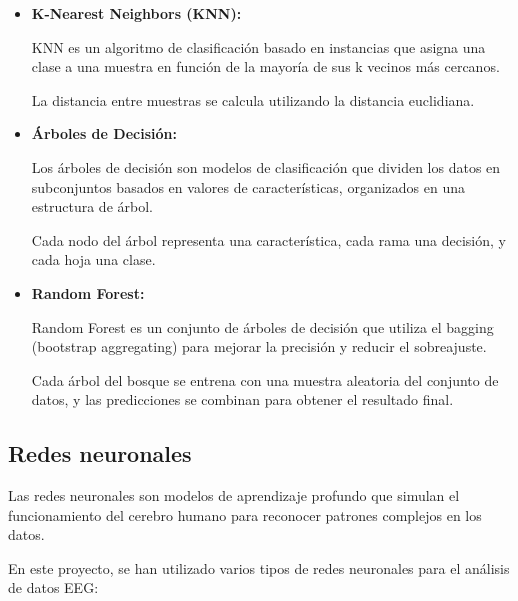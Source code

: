 \begin{itemize}
\begin{itemize}
	\item
	\textbf{K-Nearest Neighbors (KNN):}
	
	KNN es un algoritmo de clasificación basado en instancias que asigna una clase a una muestra en función de la mayoría de sus k vecinos más cercanos.
	
	La distancia entre muestras se calcula utilizando la distancia euclidiana.

	\item
	\textbf{Árboles de Decisión:}	
	
	Los árboles de decisión son modelos de clasificación que dividen los datos en subconjuntos basados en valores de características, organizados en una estructura de árbol.
	
	Cada nodo del árbol representa una característica, cada rama una decisión, y cada hoja una clase.
	

	\item
	\textbf{Random Forest:}	
	
	Random Forest es un conjunto de árboles de decisión que utiliza el bagging (bootstrap aggregating) para mejorar la precisión y reducir el sobreajuste.
	
	Cada árbol del bosque se entrena con una muestra aleatoria del conjunto de datos, y las predicciones se combinan para obtener el resultado final.

	\end{itemize}
\end{itemize}
	

\subsection{Redes neuronales}

	
	
Las redes neuronales son modelos de aprendizaje profundo que simulan el funcionamiento del cerebro humano para reconocer patrones complejos en los datos.

En este proyecto, se han utilizado varios tipos de redes neuronales para el análisis de datos EEG:		
	
